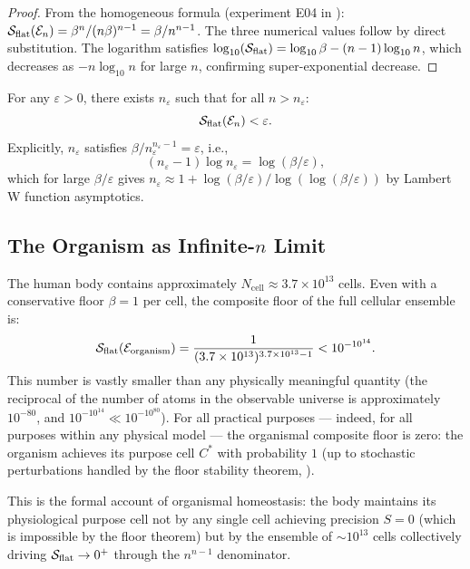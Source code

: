 \begin{proof}
From the homogeneous formula (experiment E04 in ):
$\mathcal{S}_{\mathrm{flat}}(\mathcal{E}_n) = \beta^n / (n\beta)^{n-1} = \beta /
n^{n-1}$.  The three numerical values follow by direct substitution.
The logarithm satisfies $\log_{10}(\mathcal{S}_{\mathrm{flat}}) = \log_{10}\beta
- (n-1)\log_{10} n$, which decreases as $-n\log_{10} n$ for large $n$,
confirming super-exponential decrease.
\end{proof}

\begin{corollary}
\label{cor:ch02b-epsilon-floor}
For any $\varepsilon > 0$, there exists $n_\varepsilon$ such that for all
$n > n_\varepsilon$:
\[
  \mathcal{S}_{\mathrm{flat}}(\mathcal{E}_n) < \varepsilon.
\]
Explicitly, $n_\varepsilon$ satisfies $\beta / n_\varepsilon^{n_\varepsilon - 1} = \varepsilon$, i.e.,
\[
  (n_\varepsilon - 1)\log n_\varepsilon = \log(\beta/\varepsilon),
\]
which for large $\beta/\varepsilon$ gives
$n_\varepsilon \approx 1 + \log(\beta/\varepsilon) / \log(\log(\beta/\varepsilon))$
by Lambert W function asymptotics.
\end{corollary}

\subsection{The Organism as Infinite-$n$ Limit}

\begin{remark}
\label{rem:ch02b-organism-limit}
The human body contains approximately $N_{\mathrm{cell}} \approx 3.7 \times
10^{13}$ cells.  Even with a conservative floor $\beta = 1$ per cell, the
composite floor of the full cellular ensemble is:
\[
  \mathcal{S}_{\mathrm{flat}}(\mathcal{E}_{\mathrm{organism}})
  = \frac{1}{(3.7 \times 10^{13})^{3.7 \times 10^{13} - 1}}
  < 10^{-10^{14}}.
\]
This number is vastly smaller than any physically meaningful quantity (the
reciprocal of the number of atoms in the observable universe is approximately
$10^{-80}$, and $10^{-10^{14}} \ll 10^{-10^{80}}$).  For all practical
purposes — indeed, for all purposes within any physical model — the organismal
composite floor is zero: the organism achieves its purpose cell $C^*$ with
probability $1$ (up to stochastic perturbations handled by the floor stability
theorem, ).

This is the formal account of organismal homeostasis: the body maintains its
physiological purpose cell not by any single cell achieving precision $S = 0$
(which is impossible by the floor theorem) but by the ensemble of $\sim
10^{13}$ cells collectively driving $\mathcal{S}_{\mathrm{flat}} \to 0^+$ through
the $n^{n-1}$ denominator.
\end{remark}

